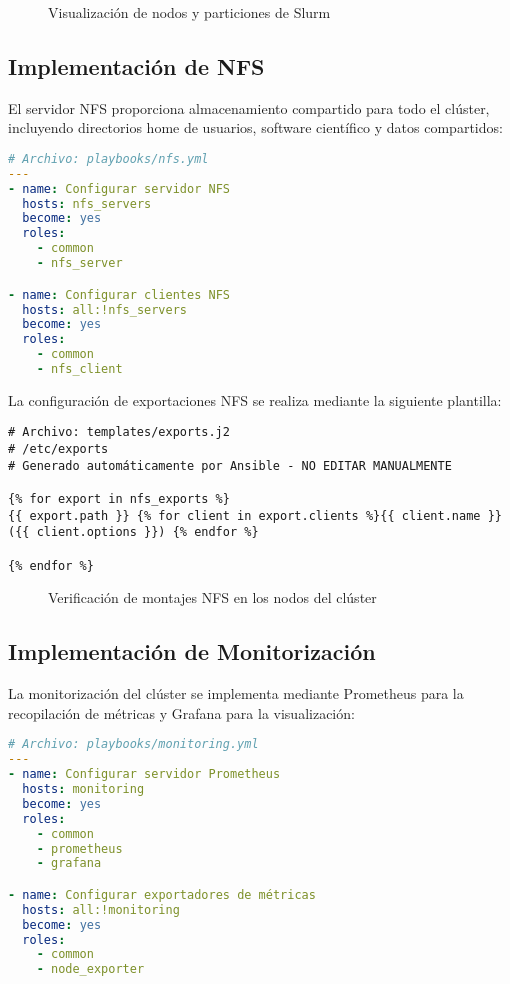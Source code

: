 \documentclass[12pt,a4paper]{report}
\begin{document}
\begin{figure}[H]
\centering
\caption{Visualización de nodos y particiones de Slurm}
\label{fig:slurm_nodes}
\end{figure}

\subsection{Implementación de NFS}

El servidor NFS proporciona almacenamiento compartido para todo el clúster, incluyendo directorios home de usuarios, software científico y datos compartidos:

\begin{lstlisting}[language=yaml]
# Archivo: playbooks/nfs.yml
---
- name: Configurar servidor NFS
  hosts: nfs_servers
  become: yes
  roles:
    - common
    - nfs_server

- name: Configurar clientes NFS
  hosts: all:!nfs_servers
  become: yes
  roles:
    - common
    - nfs_client
\end{lstlisting}

La configuración de exportaciones NFS se realiza mediante la siguiente plantilla:

\begin{lstlisting}
# Archivo: templates/exports.j2
# /etc/exports
# Generado automáticamente por Ansible - NO EDITAR MANUALMENTE

{% for export in nfs_exports %}
{{ export.path }} {% for client in export.clients %}{{ client.name }}({{ client.options }}) {% endfor %}

{% endfor %}
\end{lstlisting}

\begin{figure}[H]
\centering
\caption{Verificación de montajes NFS en los nodos del clúster}
\label{fig:nfs_mounts}
\end{figure}

\subsection{Implementación de Monitorización}

La monitorización del clúster se implementa mediante Prometheus para la recopilación de métricas y Grafana para la visualización:

\begin{lstlisting}[language=yaml]
# Archivo: playbooks/monitoring.yml
---
- name: Configurar servidor Prometheus
  hosts: monitoring
  become: yes
  roles:
    - common
    - prometheus
    - grafana

- name: Configurar exportadores de métricas
  hosts: all:!monitoring
  become: yes
  roles:
    - common
    - node_exporter
\end{lstlisting}
\end{document}
